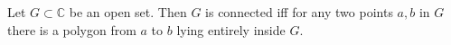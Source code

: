 Let $G \subset \mathbb{C}$ be an open set. Then $G$ is connected iff for any two points $a, b$ in $G$ there is a polygon from $a$ to $b$ lying entirely inside $G$.
